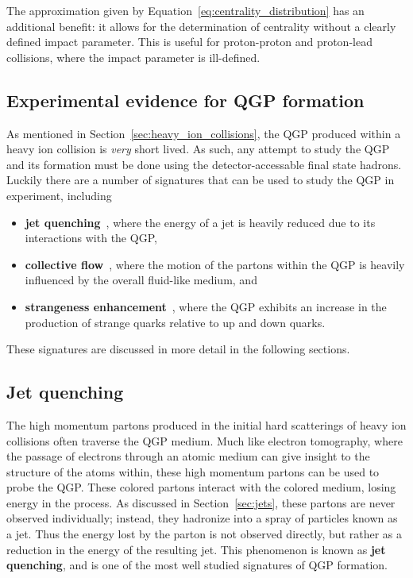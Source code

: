The approximation given by Equation~\ref{eq:centrality_distribution} has an additional benefit: it allows for the determination of centrality without a clearly defined impact parameter. This is useful for proton-proton and proton-lead collisions, where the impact parameter is ill-defined. 

\subsection{Experimental evidence for QGP formation}
\label{sec:qgp_evidence}

As mentioned in Section~\ref{sec:heavy_ion_collisions}, the QGP produced within a heavy ion collision is \textit{very} short lived. As such, any attempt to study the QGP and its formation must be done using the detector-accessable final state hadrons. Luckily there are a number of signatures that can be used to study the QGP in experiment, including
%
\begin{itemize}
    \item \textbf{jet quenching}~\cite{JetQuenching}, where the energy of a jet is heavily reduced due to its interactions with the QGP,
    \item \textbf{collective flow}~\cite{CollectiveFlow}, where the motion of the partons within the QGP is heavily influenced by the overall fluid-like medium, and
    \item \textbf{strangeness enhancement}~\cite{Strangeness}, where the QGP exhibits an increase in the production of strange quarks relative to up and down quarks.
\end{itemize}
%
These signatures are discussed in more detail in the following sections.

\subsection{Jet quenching}
\label{sec:jet_quenching}

The high momentum partons produced in the initial hard scatterings of heavy ion collisions often traverse the QGP medium. Much like electron tomography, where the passage of electrons through an atomic medium can give insight to the structure of the atoms within, these high momentum partons can be used to probe the QGP. These colored partons interact with the colored medium, losing energy in the process. As discussed in Section~\ref{sec:jets}, these partons are never observed individually; instead, they hadronize into a spray of particles known as a jet. Thus the energy lost by the parton is not observed directly, but rather as a reduction in the energy of the resulting jet. This phenomenon is known as \textbf{jet quenching}, and is one of the most well studied signatures of QGP formation.

